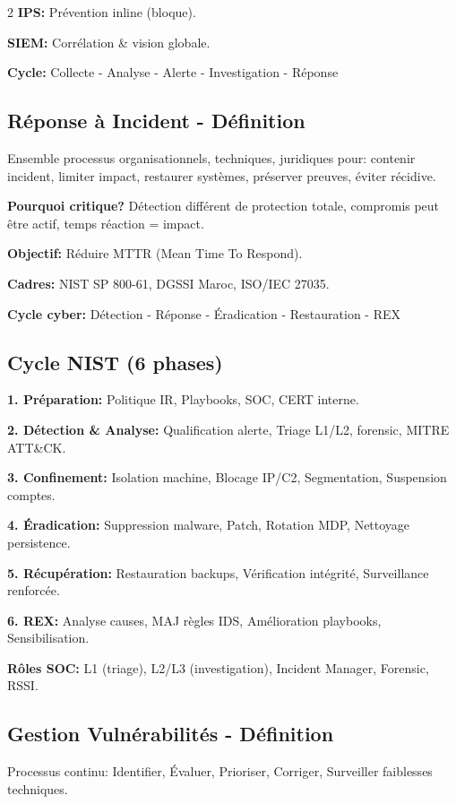 \documentclass[9pt,a4paper]{extarticle}
\begin{document}
\begin{multicols}{2}
\textbf{IPS:} Prévention inline (bloque).

\textbf{SIEM:} Corrélation \& vision globale.

\textbf{Cycle:} Collecte - Analyse - Alerte - Investigation - Réponse

\subsection*{Réponse à Incident - Définition}
Ensemble processus organisationnels, techniques, juridiques pour: contenir incident, limiter impact, restaurer systèmes, préserver preuves, éviter récidive.

\textbf{Pourquoi critique?} Détection différent de protection totale, compromis peut être actif, temps réaction = impact.

\textbf{Objectif:} Réduire MTTR (Mean Time To Respond).

\textbf{Cadres:} NIST SP 800-61, DGSSI Maroc, ISO/IEC 27035.

\textbf{Cycle cyber:} Détection - Réponse - Éradication - Restauration - REX

\subsection*{Cycle NIST (6 phases)}
\textbf{1. Préparation:} Politique IR, Playbooks, SOC, CERT interne.

\textbf{2. Détection \& Analyse:} Qualification alerte, Triage L1/L2, forensic, MITRE ATT\&CK.

\textbf{3. Confinement:} Isolation machine, Blocage IP/C2, Segmentation, Suspension comptes.

\textbf{4. Éradication:} Suppression malware, Patch, Rotation MDP, Nettoyage persistence.

\textbf{5. Récupération:} Restauration backups, Vérification intégrité, Surveillance renforcée.

\textbf{6. REX:} Analyse causes, MAJ règles IDS, Amélioration playbooks, Sensibilisation.

\textbf{Rôles SOC:} L1 (triage), L2/L3 (investigation), Incident Manager, Forensic, RSSI.

\subsection*{Gestion Vulnérabilités - Définition}
Processus continu: Identifier, Évaluer, Prioriser, Corriger, Surveiller faiblesses techniques.


\end{multicols}
\end{document}
